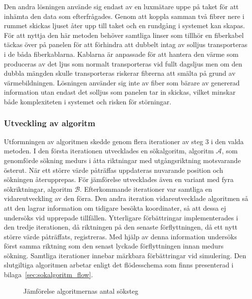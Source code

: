             Den andra lösningen använde sig endast av en luxmätare uppe på taket för att inhämta den data som efterfrågades. Genom att koppla samman två fibrer nere i rummet skickas ljuset åter upp till taket och en rundgång i systemet kan skapas. För att nyttja den här metoden behöver samtliga linser som tillhör en fiberkabel täckas över på panelen för att förhindra att dubbelt intag av solljus transporteras i de båda fiberkablarna. Kablarna är anpassade för att hantera den värme som produceras av det ljus som normalt transporteras vid fullt dagsljus men om den dubbla mängden skulle transporteras riskerar fibrerna att smälta på grund av värmebildningen. Lösningen använder sig inte av fiber som bärare av genererad information utan endast det solljus som panelen tar in skickas, vilket minskar både komplexiteten i systemet och risken för störningar.

        \subsubsection{Utveckling av algoritm} %
        \label{ssub:utveckling_av_algoritm}
            Utformningen av algoritmen skedde genom flera iterationer av steg 3 i den valda metoden. I den första iterationen utvecklades en sökalgoritm, algoritm $\mathscr{A}$, som genomförde sökning medurs i åtta riktningar med utgångsriktning motsvarande österut. När ett större värde påträffas uppdateras nuvarande position och sökningen återupprepas. För jämförelse utvecklades även en variant med fyra sökriktningar, algoritm $\mathscr{B}$. Efterkommande iterationer var samtliga en vidareutveckling av den förra. Den andra iteration vidareutvecklade algoritmen så att den lagrar information om tidigare besökta koordinater, så att dessa ej undersöks vid upprepade tillfällen. Ytterligare förbättringar implementerades i den tredje iterationen, då riktningen på den senaste förflyttningen, då ett nytt större värde påträffats, registreras. Med hjälp av denna information undersöks först samma riktning som den senast lyckade förflyttningen innan medurs sökning. Samtliga iterationer innebar märkbara förbättringar vid simulering. Den slutgiltiga algoritmen arbetar enligt det flödesschema som finns presenterad i bilaga~\ref{sec:sokalgoritm_flow}.\bigskip

            \begin{figure}[b]
                
            \caption{\label{fig:algoritm_steg} Jämförelse algoritmernas antal söksteg}
            \end{figure} 

